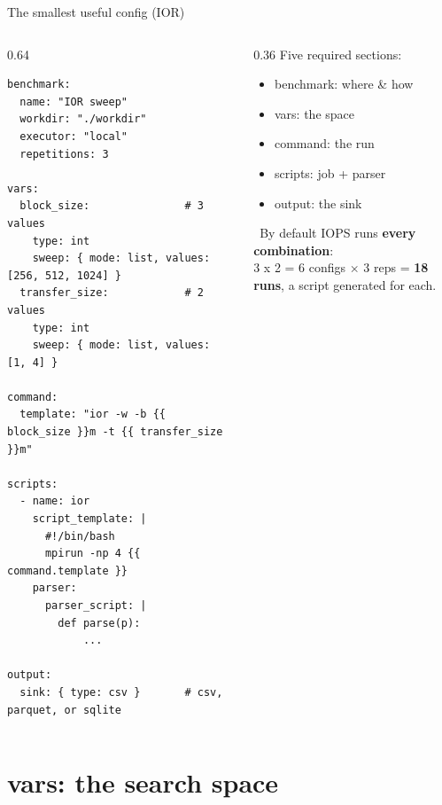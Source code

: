 \documentclass[aspectratio=169,11pt]{beamer}
\newcommand{\code}[1]{{\ttfamily\small\color{iopsNavy}#1}}
\newcommand{\hl}[1]{{\color{iopsPink}\bfseries #1}}
\begin{document}
\begin{frame}[fragile]{The smallest useful config (IOR)}
  \begin{columns}[T]
    \begin{column}{0.64\textwidth}
\begin{lstlisting}[style=yaml,basicstyle=\ttfamily\fontsize{5.3}{6.3}\selectfont,columns=fixed]
benchmark:
  name: "IOR sweep"
  workdir: "./workdir"
  executor: "local"
  repetitions: 3

vars:
  block_size:               # 3 values
    type: int
    sweep: { mode: list, values: [256, 512, 1024] }
  transfer_size:            # 2 values
    type: int
    sweep: { mode: list, values: [1, 4] }

command:
  template: "ior -w -b {{ block_size }}m -t {{ transfer_size }}m"

scripts:
  - name: ior
    script_template: |
      #!/bin/bash
      mpirun -np 4 {{ command.template }}
    parser:
      parser_script: |
        def parse(p):
            ...

output:
  sink: { type: csv }       # csv, parquet, or sqlite
\end{lstlisting}
    \end{column}
    \begin{column}{0.36\textwidth}
      Five required sections:
      \begin{itemize}
        \item \code{benchmark}: where \& how
        \item \code{vars}: the space
        \item \code{command}: the run
        \item \code{scripts}: job + parser
        \item \code{output}: the sink
      \end{itemize}
      \vspace{0.4em}
      \begin{keybox}
        \faInfoCircle~By default IOPS runs \hl{every combination}:\\[2pt]
        \code{3 x 2 = 6} configs $\times$ 3 reps = \hl{18 runs}, a script
        generated for each.
      \end{keybox}
    \end{column}
  \end{columns}
\end{frame}

\section{vars: the search space}
\end{document}
